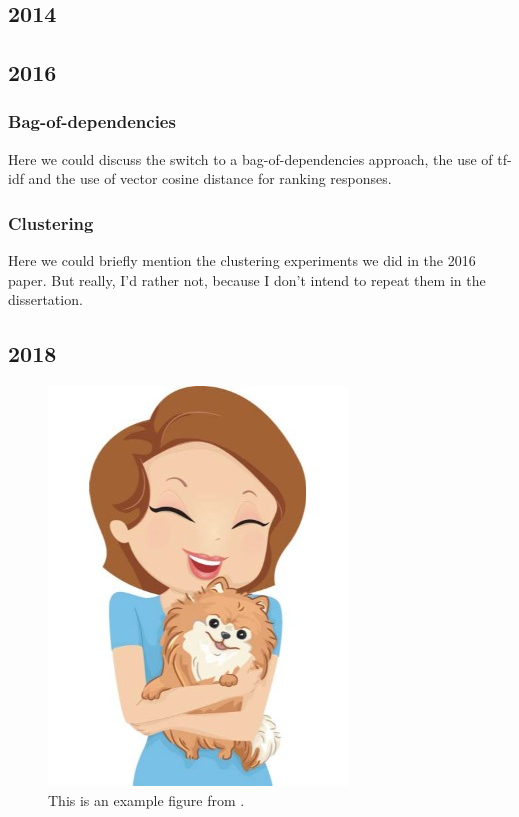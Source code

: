 \subsection{2014}
\citet{king:dickinson:14}

\subsection{2016}
\citep{king:dickinson:16}

\subsubsection{Bag-of-dependencies}
Here we could discuss the switch to a bag-of-dependencies approach, the use of tf-idf and the use of vector cosine distance for ranking responses.

\subsubsection{Clustering}
Here we could briefly mention the clustering experiments we did in the 2016 paper. But really, I'd rather not, because I don't intend to repeat them in the dissertation.

\subsection{2018}
\cite{king:dickinson:18}

\begin{figure}
\includegraphics[width=.7\textwidth]{figures/I29.jpg}
\caption{This is an example figure from \citet{king:dickinson:18}.}
\label{figure:KandD2018}
\end{figure}


